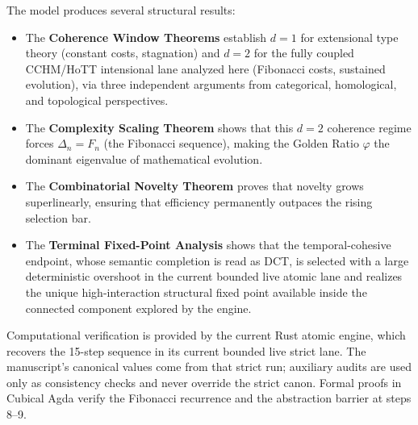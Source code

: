 \documentclass[11pt,a4paper]{article}
\theoremstyle{plain}
\theoremstyle{definition}
\theoremstyle{remark}
\begin{document}
The model produces several structural results:
\begin{itemize}[nosep]
    \item The \textbf{Coherence Window Theorems} establish $d = 1$ for extensional type theory (constant costs, stagnation) and $d = 2$ for the fully coupled CCHM/HoTT intensional lane analyzed here (Fibonacci costs, sustained evolution), via three independent arguments from categorical, homological, and topological perspectives.
    \item The \textbf{Complexity Scaling Theorem} shows that this $d = 2$ coherence regime forces $\Delta_n = F_n$ (the Fibonacci sequence), making the Golden Ratio $\varphi$ the dominant eigenvalue of mathematical evolution.
    \item The \textbf{Combinatorial Novelty Theorem} proves that novelty grows superlinearly, ensuring that efficiency permanently outpaces the rising selection bar.
    \item The \textbf{Terminal Fixed-Point Analysis} shows that the temporal-cohesive endpoint, whose semantic completion is read as DCT, is selected with a large deterministic overshoot in the current bounded live atomic lane and realizes the unique high-interaction structural fixed point available inside the connected component explored by the engine.
\end{itemize}
Computational verification is provided by the current Rust atomic engine, which recovers the 15-step sequence in its current bounded live strict lane.
The manuscript's canonical values come from that strict run; auxiliary audits are used only as consistency checks and never override the strict canon.
Formal proofs in Cubical Agda verify the Fibonacci recurrence and the abstraction barrier at steps 8--9.
\end{document}
